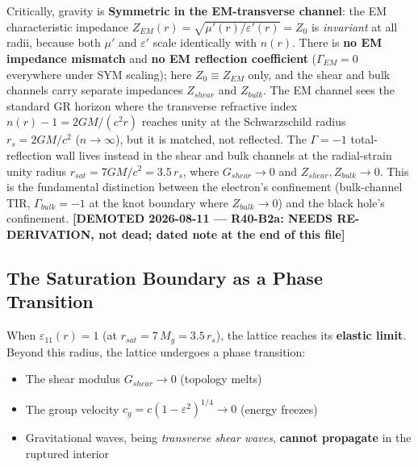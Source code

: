 Critically, gravity is \textbf{Symmetric in the EM-transverse channel}: the EM characteristic impedance $Z_{EM}(r) = \sqrt{\mu'(r)/\varepsilon'(r)} = Z_0$ is \textit{invariant} at all radii, because both $\mu'$ and $\varepsilon'$ scale identically with $n(r)$. There is \textbf{no EM impedance mismatch} and \textbf{no EM reflection coefficient} ($\Gamma_{EM} = 0$ everywhere under SYM scaling); here $Z_0 \equiv Z_{EM}$ only, and the shear and bulk channels carry separate impedances $Z_{shear}$ and $Z_{bulk}$. The EM channel sees the standard GR horizon where the transverse refractive index $n(r) - 1 = 2GM/(c^2 r)$ reaches unity at the Schwarzschild radius $r_s = 2GM/c^2$ ($n \to \infty$), but it is matched, not reflected. The $\Gamma = -1$\gammaundeclared{} total-reflection wall lives instead in the shear and bulk channels at the radial-strain unity radius $r_{sat} = 7GM/c^2 = 3.5\,r_s$, where $G_{shear} \to 0$ and $Z_{shear}, Z_{bulk} \to 0$. This is the fundamental distinction between the electron's confinement (bulk-channel TIR, $\Gamma_{bulk} = -1$ at the knot boundary where $Z_{bulk} \to 0$) and the black hole's confinement. \textbf{[DEMOTED 2026-08-11 --- R40-B2a: NEEDS RE-DERIVATION, not dead; dated note at the end of this file]}

\subsection{The Saturation Boundary as a Phase Transition}

When $\varepsilon_{11}(r) = 1$ (at $r_{sat} = 7\,M_g = 3.5\,r_s$), the lattice reaches its \textbf{elastic limit}. Beyond this radius, the lattice undergoes a phase transition:
\begin{itemize}
    \item The shear modulus $G_{shear} \to 0$ (topology melts)
    \item The group velocity $c_g = c(1-\varepsilon^2)^{1/4} \to 0$ (energy freezes)
    \item Gravitational waves, being \textit{transverse shear waves}, \textbf{cannot propagate} in the ruptured interior
\end{itemize}


